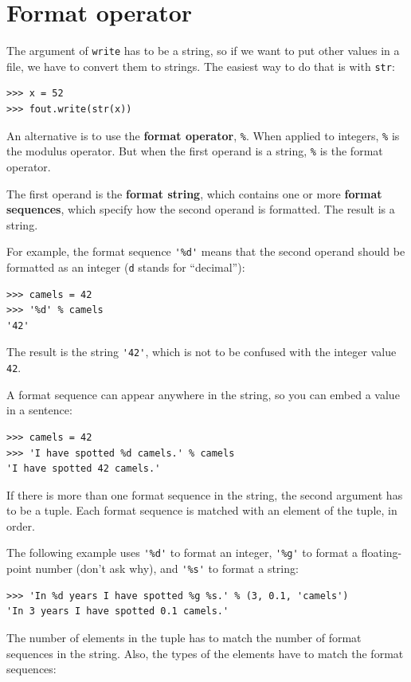 \documentclass[10pt]{book}
\begin{document}
\section{Format operator}

The argument of {\tt write} has to be a string, so if we want
to put other values in a file, we have to convert them to
strings.  The easiest way to do that is with {\tt str}:

\begin{verbatim}
>>> x = 52
>>> fout.write(str(x))
\end{verbatim}
%
An alternative is to use the {\bf format operator}, {\tt \%}.  When
applied to integers, {\tt \%} is the modulus operator.  But
when the first operand is a string, {\tt \%} is the format operator.

The first operand is the {\bf format string}, which contains
one or more {\bf format sequences}, which
specify how
the second operand is formatted.  The result is a string.

For example, the format sequence \verb"'%d'" means that
the second operand should be formatted as an
integer ({\tt d} stands for ``decimal''):

\begin{verbatim}
>>> camels = 42
>>> '%d' % camels
'42'
\end{verbatim}
%
The result is the string \verb"'42'", which is not to be confused
with the integer value {\tt 42}.

A format sequence can appear anywhere in the string,
so you can embed a value in a sentence:

\begin{verbatim}
>>> camels = 42
>>> 'I have spotted %d camels.' % camels
'I have spotted 42 camels.'
\end{verbatim}
%
If there is more than one format sequence in the string,
the second argument has to be a tuple.  Each format sequence is
matched with an element of the tuple, in order.

The following example uses \verb"'%d'" to format an integer,
\verb"'%g'" to format
a floating-point number (don't ask why), and \verb"'%s'" to format
a string:

\begin{verbatim}
>>> 'In %d years I have spotted %g %s.' % (3, 0.1, 'camels')
'In 3 years I have spotted 0.1 camels.'
\end{verbatim}
%
The number of elements in the tuple has to match the number
of format sequences in the string.  Also, the types of the
elements have to match the format sequences:
\end{document}
